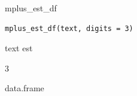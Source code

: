\documentclass[a4paper]{book}
\begin{document}
%
\begin{Description}
mplus\_est\_df
\end{Description}
%
\begin{Usage}
\begin{verbatim}
mplus_est_df(text, digits = 3)
\end{verbatim}
\end{Usage}
%
\begin{Arguments}
\begin{ldescription}
\item[\code{text}] text est

\item[\code{digits}] 3
\end{ldescription}
\end{Arguments}
%
\begin{Value}
data.frame
\end{Value}
%
\end{document}
